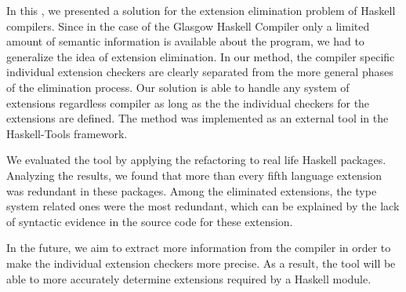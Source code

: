 \documentclass[main.tex]{subfiles}
\begin{document}
	
	In this \paper{}, we presented a solution for the extension elimination problem of Haskell compilers. Since in the case of the Glasgow Haskell Compiler only a limited amount of semantic information is available about the program, we had to generalize the idea of extension elimination. In our method, the compiler specific individual extension checkers are clearly separated from the more general phases of the elimination process. Our solution is able to handle any system of extensions regardless compiler as long as the the individual checkers for the extensions are defined. The method was implemented as an external tool in the Haskell-Tools framework.
	
	We evaluated the tool by applying the refactoring to real life Haskell packages. Analyzing the results, we found that more than every fifth language extension was redundant in these packages. Among the eliminated extensions, the type system related ones were the most redundant, which can be explained by the lack of syntactic evidence in the source code for these extension.
	
	In the future, we aim to extract more information from the compiler in order to make the individual extension checkers more precise. As a result, the tool will be able to more accurately determine extensions required by a Haskell module.
	
\end{document}
